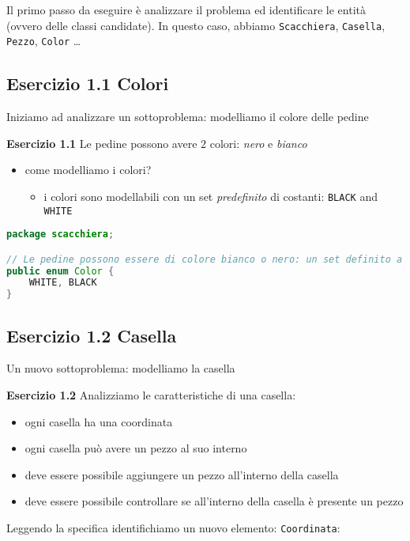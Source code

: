 \documentclass{article}
\begin{document}
Il primo passo da eseguire \`e analizzare il problema ed identificare le entit\`a (ovvero delle classi candidate). In questo caso, abbiamo \texttt{Scacchiera}, \texttt{Casella}, \texttt{Pezzo},  \texttt{Color} \ldots

\subsection{Esercizio 1.1 Colori}
Iniziamo ad analizzare un sottoproblema: modelliamo il colore delle pedine
\begin{framed}
\textbf{Esercizio 1.1} Le pedine possono avere $2$ colori: \emph{nero} e \emph{bianco}
\end{framed}
\begin{itemize}
\item come modelliamo i colori?
\begin{itemize}
\item i colori sono modellabili con un set \emph{predefinito} di costanti: \texttt{BLACK} and \texttt{WHITE}
\end{itemize}
\end{itemize}

\begin{lstlisting}[language=Java,escapechar=|]
package scacchiera;

// Le pedine possono essere di colore bianco o nero: un set definito a priori E NON modificabile di valori
public enum Color {
	WHITE, BLACK
}
\end{lstlisting}

\subsection{Esercizio 1.2 Casella}
Un nuovo sottoproblema: modelliamo la casella
\begin{framed}
\textbf{Esercizio 1.2} Analizziamo le caratteristiche di una casella:
\begin{itemize}
\item ogni casella ha una coordinata
\item ogni casella pu\`o avere un pezzo al suo interno
\item deve essere possibile aggiungere un pezzo all'interno della casella
\item deve essere possibile controllare se all'interno della casella \`e presente un pezzo
\end{itemize}
\end{framed}

Leggendo la specifica identifichiamo un nuovo elemento: \texttt{Coordinata}: 
\end{document}
